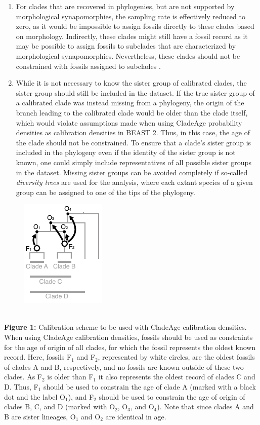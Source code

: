 \documentclass{article}
\begin{document}
\begin{enumerate}
\item For clades that are recovered in phylogenies, but are not supported by morphological synapomorphies, the sampling rate is effectively reduced to zero, as it would be impossible to assign fossils directly to these clades based on morphology. Indirectly, these clades might still have a fossil record as it may be possible to assign fossils to subclades that are characterized by morphological synapomorphies. Nevertheless, these clades should not be constrained with fossils assigned to subclades \citep[see][for a more detailed discussion of this case]{Matschiner:2016ga}.
\item While it is not necessary to know the sister group of calibrated clades, the sister group should still be included in the dataset. If the true sister group of a calibrated clade was instead missing from a phylogeny, the origin of the branch leading to the calibrated clade would be older than the clade itself, which would violate assumptions made when using CladeAge probability densities as calibration densities in BEAST 2. Thus, in this case, the age of the clade should not be constrained. To ensure that a clade's sister group is included in the phylogeny even if the identity of the sister group is not known, one could simply include representatives of all possible sister groups in the dataset. Missing sister groups can be avoided completely if so-called \emph{diversity trees} \citep{Alfaro:2009vc} are used for the analysis, where each extant species of a given group can be assigned to one of the tips of the phylogeny.
\end{enumerate}

\noindent
\begin{figure}[h!]
   \centering
   \includegraphics[width=35 mm]{fig1}
\end{figure}\\
\textbf{Figure 1:} Calibration scheme to be used with CladeAge calibration densities.\\
When using CladeAge calibration densities, fossils should be used as constraints for the age of origin of all clades, for which the fossil represents the oldest known record. Here, fossils F$_1$ and F$_2$, represented by white circles, are the oldest fossils of clades A and B, respectively, and no fossils are known outside of these two clades. As F$_2$ is older than F$_1$ it also represents the oldest record of clades C and D. Thus, F$_1$ should be used to constrain the age of clade A (marked with a black dot and the label O$_1$), and F$_2$ should be used to constrain the age of origin of clades B, C, and D (marked with O$_2$, O$_3$, and O$_4$). Note that since clades A and B are sister lineages, O$_1$ and O$_2$ are identical in age.
\newpage
\end{document}
